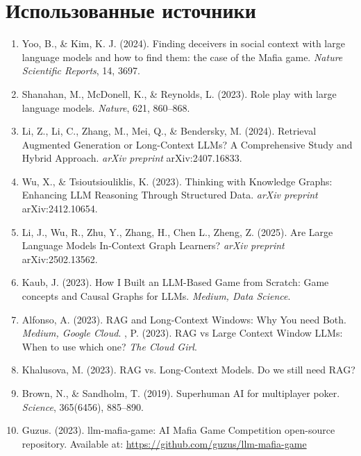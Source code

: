 \documentclass[a4paper,12pt]{article}
\begin{document}
\section*{Использованные источники}

\begin{enumerate}
    \item Yoo, B., \& Kim, K. J. (2024). Finding deceivers in social context with large language models and how to find them: the case of the Mafia game. \textit{Nature Scientific Reports}, 14, 3697.
    \item Shanahan, M., McDonell, K., \& Reynolds, L. (2023). Role play with large language models. \textit{Nature}, 621, 860--868.
    \item Li, Z., Li, C., Zhang, M., Mei, Q., \& Bendersky, M. (2024). Retrieval Augmented Generation or Long-Context LLMs? A Comprehensive Study and Hybrid Approach. \textit{arXiv preprint} arXiv:2407.16833.
    \item Wu, X., \& Tsioutsiouliklis, K. (2023). Thinking with Knowledge Graphs: Enhancing LLM Reasoning Through Structured Data. \textit{arXiv preprint} arXiv:2412.10654.
    \item Li, J., Wu, R., Zhu, Y., Zhang, H., Chen L., Zheng, Z. (2025). Are Large Language Models In-Context Graph Learners? \textit{arXiv preprint} arXiv:2502.13562.
    \item Kaub, J. (2023). How I Built an LLM-Based Game from Scratch: Game concepts and Causal Graphs for LLMs. \textit{Medium, Data Science}.
    \item Alfonso, A. (2023). RAG and Long-Context Windows: Why You need Both. \textit{Medium, Google Cloud}.
    \itemadia, P. (2023). RAG vs Large Context Window LLMs: When to use which one? \textit{The Cloud Girl}.
    \item Khalusova, M. (2023). RAG vs. Long-Context Models. Do we still need RAG?
    \item Brown, N., \& Sandholm, T. (2019). Superhuman AI for multiplayer poker. \textit{Science}, 365(6456), 885--890.
    \item Guzus. (2023). llm-mafia-game: AI Mafia Game Competition open-source repository. Available at: \url{https://github.com/guzus/llm-mafia-game}
\end{enumerate}
\end{document}
